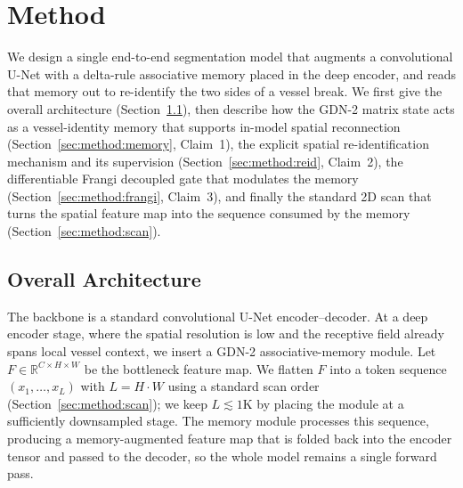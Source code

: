 
\section{Method}
\label{sec:method}

We design a single end-to-end segmentation model that augments a convolutional
U-Net with a delta-rule associative memory placed in the deep encoder, and reads
that memory out to re-identify the two sides of a vessel break. We first give the
overall architecture (Section~\ref{sec:method:arch}), then describe how the GDN-2
matrix state acts as a vessel-identity memory that supports in-model spatial
reconnection (Section~\ref{sec:method:memory}, Claim~1), the explicit spatial
re-identification mechanism and its supervision (Section~\ref{sec:method:reid},
Claim~2), the differentiable Frangi decoupled gate that modulates the memory
(Section~\ref{sec:method:frangi}, Claim~3), and finally the standard 2D scan that
turns the spatial feature map into the sequence consumed by the memory
(Section~\ref{sec:method:scan}).

\subsection{Overall Architecture}
\label{sec:method:arch}

The backbone is a standard convolutional U-Net encoder--decoder. At a deep encoder
stage, where the spatial resolution is low and the receptive field already spans
local vessel context, we insert a GDN-2 associative-memory module. Let
$F \in \mathbb{R}^{C \times H \times W}$ be the bottleneck feature map. We flatten
$F$ into a token sequence $(x_1, \dots, x_L)$ with $L = H \cdot W$ using a standard
scan order (Section~\ref{sec:method:scan}); we keep $L \lesssim 1\mathrm{K}$ by
placing the module at a sufficiently downsampled stage. The memory module processes
this sequence, producing a memory-augmented feature map that is folded back into the
encoder tensor and passed to the decoder, so the whole model remains a single
forward pass.

